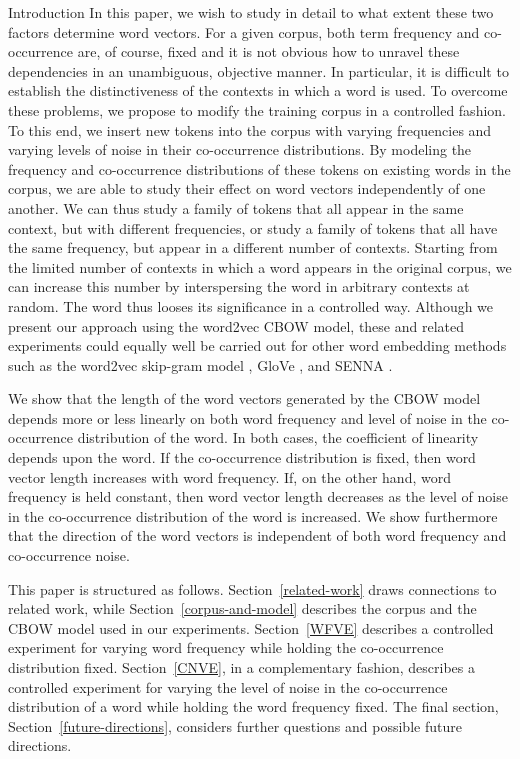 \documentclass{article} %
\begin{document}
\begin{section}{Introduction}
In this paper, we wish to study in detail to what extent these two
factors determine word vectors.  For a given corpus, both term
frequency and co-occurrence are, of course, fixed and it is not obvious
how to unravel these dependencies in an unambiguous, objective manner.
In particular, it is difficult to establish the distinctiveness of the
contexts in which a word is used.  To overcome these problems, we
propose to modify the training corpus in a controlled fashion.  To
this end, we insert new tokens into the corpus with varying frequencies
and varying levels of noise in their co-occurrence distributions.  By
modeling the frequency and co-occurrence distributions of these tokens
on existing words in the corpus, we are able to study their effect on
word vectors independently of one another.  We can thus study a family
of tokens that all appear in the same context, but with different
frequencies, or study a family of tokens that all have the same
frequency, but appear in a different number of contexts.  Starting from
the limited number of contexts in which a word appears in the original
corpus, we can increase this number by interspersing the word in arbitrary
contexts at random.  The word thus looses its significance in a
controlled way.  Although we present our approach using the word2vec
CBOW model, these and related experiments could equally well be carried
out for other word embedding methods such as the word2vec skip-gram
model \cite{DistRepns,EfficientEstimation}, GloVe
\cite{pennington2014glove}, and SENNA \cite{collobert-2011}.

We show that the length of the word vectors generated by the CBOW model
depends more or less linearly on both word frequency and level of noise
in the co-occurrence distribution of the word.  In both cases, the
coefficient of linearity depends upon the word.  If the co-occurrence
distribution is fixed, then word vector length increases with word
frequency.  If, on the other hand, word frequency is held constant, then
word vector length decreases as the level of noise in the co-occurrence
distribution of the word is increased.  We show furthermore that the
direction of the word vectors is independent of both word frequency and
co-occurrence noise.

This paper is structured as follows.  Section~\ref{related-work} draws
connections to related work, while Section~\ref{corpus-and-model} describes
the corpus and the CBOW model used in our experiments.
Section~\ref{WFVE} describes a controlled experiment for varying word
frequency while holding the co-occurrence distribution fixed.
Section~\ref{CNVE}, in a complementary fashion, describes a controlled
experiment for varying the level of noise in the co-occurrence
distribution of a word while holding the word frequency fixed.  The
final section, Section~\ref{future-directions}, considers further questions
and possible future directions.
\end{section}
\end{document}
